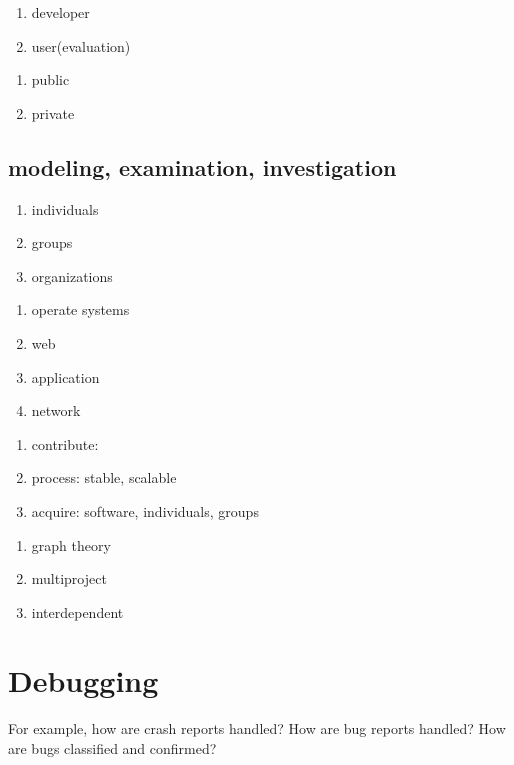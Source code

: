 \documentclass[draftclsnofoot,journal,onecolumn,12pt]{IEEEtran}
\begin{document}
\begin{enumerate}
  \item developer
  \item user(evaluation)
\end{enumerate}

\begin{enumerate}
  \item public
  \item private
\end{enumerate}

\subsection{modeling, examination, investigation}

\begin{enumerate}
  \item individuals
  \item groups
  \item organizations
\end{enumerate}

\begin{enumerate}
  \item operate systems
  \item web
  \item application
  \item network
\end{enumerate}

\begin{enumerate}
  \item contribute:
  \item process: stable, scalable
  \item acquire: software, individuals, groups
\end{enumerate}

\begin{enumerate}
  \item graph theory
  \item multiproject
  \item interdependent
\end{enumerate}

\section{Debugging}

For example, how are crash reports handled? How are bug reports handled? How are bugs classified and confirmed?
\end{document}
